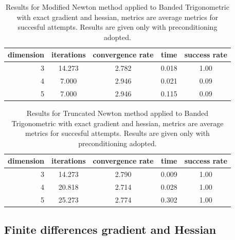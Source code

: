 \begin{table}
\centering
\caption{Results for Modified Newton method applied to Banded Trigonometric with exact gradient and hessian, metrics are average metrics for succesful attempts. Results are given only with preconditioning adopted.}
\label{tab:Modified_Newton_Banded_Trigonometric_exact}
\begin{tabular}{r|cc|cc}
\toprule
    dimension & iterations & convergence rate & time & success rate \\
\midrule
3 & 14.273 & 2.782 & 0.018 & 1.00 \\
4 & 7.000 & 2.946 & 0.021 & 0.09 \\
5 & 7.000 & 2.946 & 0.115 & 0.09 \\
\bottomrule
\end{tabular}
\end{table}

\begin{table}
\centering
\caption{Results for Truncated Newton method applied to Banded Trigonometric with exact gradient and hessian, metrics are average metrics for succesful attempts. Results are given only with preconditioning adopted.}
\label{tab:Truncated_Newton_Banded_Trigonometric_exact}
\begin{tabular}{r|cc|cc}
\toprule
    dimension & iterations & convergence rate & time & success rate \\
\midrule
3 & 14.273 & 2.790 & 0.009 & 1.00 \\
4 & 20.818 & 2.714 & 0.028 & 1.00 \\
5 & 25.273 & 2.774 & 0.302 & 1.00 \\
\bottomrule
\end{tabular}
\end{table}

\subsection{Finite differences gradient and Hessian}

